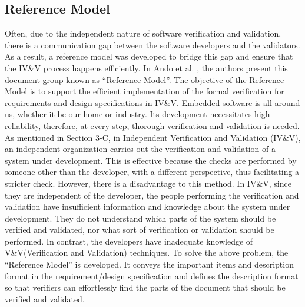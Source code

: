 \documentclass[journal, onecolumn]{IEEEtran}
\begin{document}
	\subsection{Reference Model}
	\bigskip
	Often, due to the independent nature of software verification and validation, there is a communication gap between the software developers and the validators. As a result, a reference model was developed to bridge this gap and ensure that the IV\&V process happens efficiently. In Ando et al. \cite{refmod}, the authors present this document group known as “Reference Model”.
	\newline \newline
	The objective of the Reference Model is to support the efficient implementation of the formal verification for requirements and design specifications in IV\&V.
	\newline \newline
	Embedded software is all around us, whether it be our home or industry. Its development necessitates high reliability, therefore, at every step, thorough verification and validation is needed.
	\newline \newline
	As mentioned in Section 3-C, in Independent Verification and Validation (IV\&V), an independent organization carries out the verification and validation of a system under development. This is effective because the checks are performed by someone other than the developer, with a different perspective, thus facilitating a stricter check.
	\newline \newline
	However, there is a disadvantage to this method. In IV\&V, since they are independent of the developer, the people performing the verification and validation have insufficient information and knowledge about the system under development. They do not understand which parts of the system should be verified and validated, nor what sort of verification or validation should be performed. In contrast, the developers have inadequate knowledge of V\&V(Verification and Validation) techniques. 
	\newline \newline
	To solve the above problem, the “Reference Model” is developed. It conveys the important items and description format in the requirement/design specification and defines the description format so that verifiers can effortlessly find the parts of the document that should be verified and validated.
	\newline \newline
\end{document}
